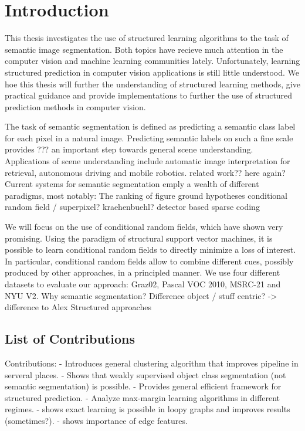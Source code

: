\chapter{Introduction}
This thesis investigates the use of structured learning algorithms to the task of semantic image
segmentation. Both topics have recieve much attention in the computer vision
and machine learning communities lately. Unfortunately, learning structured
prediction in computer vision applications is still little understood.
We hoe this thesis will further the understanding of structured learning methods,
give practical guidance and provide implementations to further the use of structured
prediction methods in computer vision.

The task of semantic segmentation is defined as predicting a semantic class label
for each pixel in a natural image. Predicting semantic labels on such a fine scale
provides ??? an important step towards general scene understanding.
%
Applications of scene understanding include automatic image interpretation for retrieval,
 autonomous driving and mobile robotics.
%
related work?? here again?
Current systems for semantic segmentation emply a wealth of different paradigms, most notably:
The ranking of figure ground hypotheses
conditional random field / superpixel? kraehenbuehl?
detector based
sparse coding

We will focus on the use of conditional random fields, which have shown very promising.
Using the paradigm of structural support vector machines, it is possible to learn conditional
random fields to directly minimize a loss of interest. In particular, conditional random fields allow
to combine different cues, possibly produced by other approaches, in a principled manner.
%
We use four different datasets to evaluate our approach: Graz02, Pascal VOC 2010, MSRC-21
and NYU V2.
%
Why semantic segmentation? Difference object / stuff centric? -> difference to Alex
Structured approaches
%

\section{List of Contributions}
Contributions:
- Introduces general clustering algorithm that improves pipeline in serveral places.
- Shows that weakly supervised object class segmentation (not semantic segmentation) is possible.
- Provides general efficient framework for structured prediction.
- Analyze max-margin learning algorithms in different regimes.
- shows exact learning is possible in loopy graphs and improves results (sometimes?).
- shows importance of edge features.

